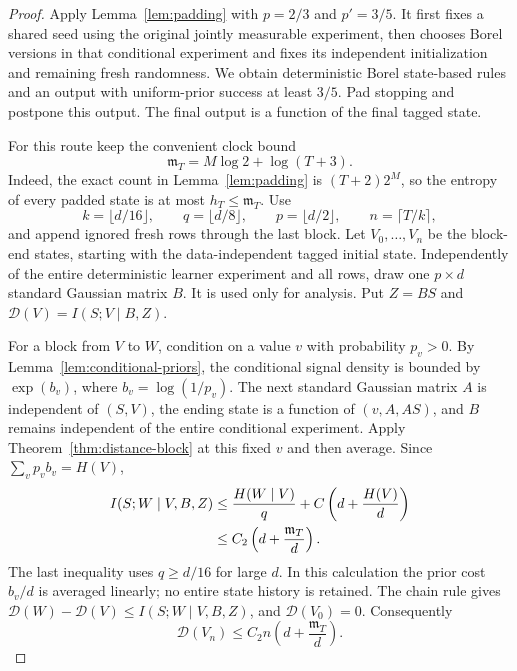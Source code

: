 \begin{proof}
Apply Lemma~\ref{lem:padding} with $p=2/3$ and $p'=3/5$. It first fixes a
shared seed using the original jointly measurable experiment, then chooses
Borel versions in that conditional experiment and fixes its independent
initialization and remaining fresh randomness. We obtain deterministic
Borel state-based rules and an output with uniform-prior success at least
$3/5$. Pad stopping and postpone this output. The final output is a
function of the final tagged state.

For this route keep the convenient clock bound
\begin{equation}\label{eq:distance-clock-width}
 \mathfrak m_T=M\log2+\log(T+3).
\end{equation}
Indeed, the exact count in Lemma~\ref{lem:padding} is $(T+2)2^M$, so the
entropy of every padded state is at most $h_T\le\mathfrak m_T$.
Use
\[
 k=\lfloor d/16\rfloor,\qquad q=\lfloor d/8\rfloor,\qquad
 p=\lfloor d/2\rfloor,\qquad n=\lceil T/k\rceil,
\]
and append ignored fresh rows through the last block. Let $V_0,\ldots,V_n$
be the block-end states, starting with the data-independent tagged initial
state. Independently of the entire deterministic learner experiment and
all rows, draw one $p\times d$ standard Gaussian matrix $B$. It is used
only for analysis. Put $Z=BS$ and
$\mathcal D(V)=I(S;V\mid B,Z)$.

For a block from $V$ to $W$, condition on a value $v$ with probability
$p_v>0$. By Lemma~\ref{lem:conditional-priors}, the conditional signal density is bounded by
$\exp(b_v)$, where $b_v=\log(1/p_v)$. The next standard Gaussian matrix
$A$ is independent of $(S,V)$, the ending state is a function of
$(v,A,AS)$, and $B$ remains independent of the entire conditional
experiment. Apply Theorem~\ref{thm:distance-block} at this fixed $v$ and
then average. Since $\sum_vp_vb_v=H(V)$,
\begin{align}
 I(S;W\mid V,B,Z)
 &\le \frac{H(W\mid V)}q+C\left(d+\frac{H(V)}d\right) \notag\\
 &\le C_2\left(d+\frac{\mathfrak m_T}{d}\right).
 \label{eq:distance-current-step}
\end{align}
The last inequality uses $q\ge d/16$ for large $d$. In this calculation
the prior cost $b_v/d$ is averaged linearly; no entire state history is
retained. The chain rule gives
$\mathcal D(W)-\mathcal D(V)\le I(S;W\mid V,B,Z)$, and
$\mathcal D(V_0)=0$. Consequently
\begin{equation}\label{eq:distance-information-clock}
 \mathcal D(V_n)\le C_2 n\left(d+\frac{\mathfrak m_T}{d}\right).
\end{equation}


\end{proof}
